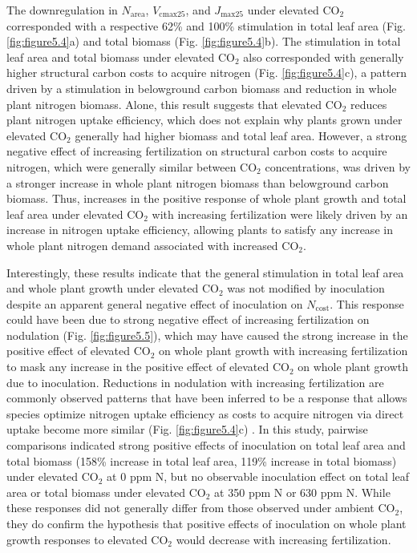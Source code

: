 The downregulation in $N_\mathrm{area}$, $V_\mathrm{cmax25}$, and $J_\mathrm{max25}$ under elevated CO$_2$ corresponded with a respective 62\% and 100\% stimulation in total leaf area (Fig. \ref{fig:figure5.4}a) and total biomass (Fig. \ref{fig:figure5.4}b). The stimulation in total leaf area and total biomass under elevated CO$_2$ also corresponded with generally higher structural carbon costs to acquire nitrogen (Fig. \ref{fig:figure5.4}c), a pattern driven by a stimulation in belowground carbon biomass and reduction in whole plant nitrogen biomass. Alone, this result suggests that elevated CO$_2$ reduces plant nitrogen uptake efficiency, which does not explain why plants grown under elevated CO$_2$ generally had higher biomass and total leaf area. However, a strong negative effect of increasing fertilization on structural carbon costs to acquire nitrogen, which were generally similar between CO$_2$ concentrations, was driven by a stronger increase in whole plant nitrogen biomass than belowground carbon biomass. Thus, increases in the positive response of whole plant growth and total leaf area under elevated CO$_2$ with increasing fertilization were likely driven by an increase in nitrogen uptake efficiency, allowing plants to satisfy any increase in whole plant nitrogen demand associated with increased CO$_2$.

Interestingly, these results indicate that the general stimulation in total leaf area and whole plant growth under elevated CO$_2$ was not modified by inoculation despite an apparent general negative effect of inoculation on $N_\mathrm{cost}$. This response could have been due to strong negative effect of increasing fertilization on nodulation (Fig. \ref{fig:figure5.5}), which may have caused the strong increase in the positive effect of elevated CO$_2$ on whole plant growth with increasing fertilization to mask any increase in the positive effect of elevated CO$_2$ on whole plant growth due to inoculation. Reductions in nodulation with increasing fertilization are commonly observed patterns that have been inferred to be a response that allows species optimize nitrogen uptake efficiency as costs to acquire nitrogen via direct uptake become more similar (Fig. \ref{fig:figure5.4}c) . In this study, pairwise comparisons indicated strong positive effects of inoculation on total leaf area and total biomass (158\% increase in total leaf area, 119\% increase in total biomass) under elevated CO$_2$ at 0 ppm N, but no observable inoculation effect on total leaf area or total biomass under elevated CO$_2$ at 350 ppm N or 630 ppm N. While these responses did not generally differ from those observed under ambient CO$_2$, they do confirm the hypothesis that positive effects of inoculation on whole plant growth responses to elevated CO$_2$ would decrease with increasing fertilization.

